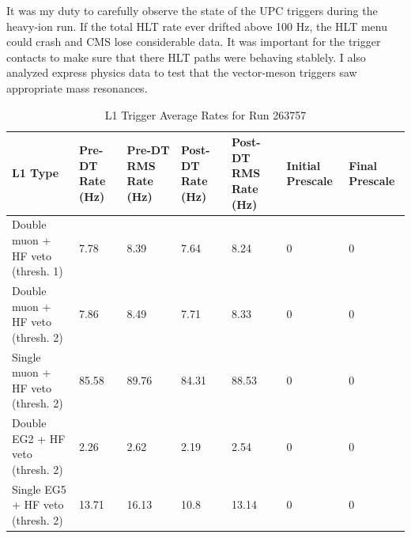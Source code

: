It was my duty to carefully observe the state of the UPC triggers during the heavy-ion run. If the total HLT rate ever drifted above 100 Hz, the HLT menu could crash and CMS lose considerable data. It was important for the trigger contacts to make sure that there HLT paths were behaving stablely. I also analyzed express physics data to test that the vector-meson triggers saw appropriate mass resonances.

\begin{table}[h!]
\centering
\caption{L1 Trigger Average Rates for Run 263757}
\label{my-label}
\begin{tabular}{@{}l|p{1.6cm}|p{1.6cm}|p{1.6cm}|p{1.6cm}|p{1.3cm}|p{1.3cm}|}
\toprule
L1 Type                           & Pre-DT Rate (Hz) & Pre-DT RMS Rate (Hz) & Post-DT Rate (Hz) & Post-DT RMS Rate (Hz) & Initial Prescale & Final Prescale \\ \midrule
Double muon + HF veto (thresh. 1) & 7.78             & 8.39                 & 7.64              & 8.24                  & 0                & 0              \\
Double muon + HF veto (thresh. 2) & 7.86             & 8.49                 & 7.71              & 8.33                  & 0                & 0              \\
Single muon + HF veto (thresh. 2) & 85.58            & 89.76                & 84.31             & 88.53                 & 0                & 0              \\
Double EG2 + HF veto (thresh. 2)  & 2.26             & 2.62                 & 2.19              & 2.54                  & 0                & 0              \\
Single EG5 + HF veto (thresh. 2)  & 13.71            & 16.13                & 10.8              & 13.14                 & 0                & 0              \\ \bottomrule
\end{tabular}
\end{table}


